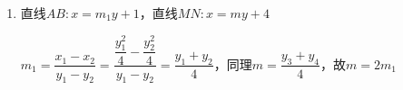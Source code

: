 \begin{enumerate}
\begin{jieda}
\begin{enumerate}
            易知直线$AB$斜率不为0，设直线$AB: x = m_1y+1$，则有$4(m_1y+1) = y^2$，即$y^2-4m_1y-4 = 0, \Delta > 0$，根据韦达定理有$y_1y_2 = -4$.
            
            易知直线$AM$斜率不为0，设直线$AM: x = m_2y+2$则有$4(m_2y+2) = y^2$，即$y^2-4m_2y-8 = 0, \Delta > 0$，根据韦达定理有$y_1y_3 = -8$，同理可得$y_2y_4 = -8$，故$y_3 = 2y_2, y_4 = 2y_1$，因此$y_3y_4 = 4y_1y_2 = -16$

            设直线$MN$的直线方程为$x = my+n$，则有$4(my+n) = y^2$，即$y^2-4my-4n = 0, \Delta > 0$，根据韦达定理有$y_3y_4 = -4n$，故$-4n = -16$，$n = 4$，因此$MN$恒过定点$(4, 0)$

            \item 直线$AB: x = m_1y+1$，直线$MN: x = my+4$
            
            $m_1 = \dfrac{x_1-x_2}{y_1-y_2} = \dfrac{\dfrac{y_1^2}{4} - \dfrac{y_2^2}{4}}{y_1-y_2} = \dfrac{y_1+y_2}{4}$，同理$m = \dfrac{y_3+y_4}{4}$，故$m = 2m_1$

            

\end{enumerate}
\end{jieda}
\end{enumerate}
